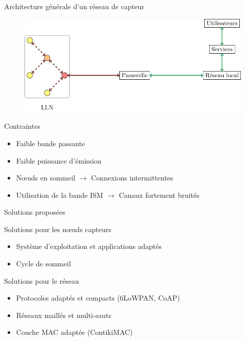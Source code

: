 \begin{frame}{Architecture générale d'un réseau de capteur}
  \begin{figure}
    \centering
    \includegraphics[scale=.75]{figures/schema_passerelle_slides.pdf}
  \end{figure}
  \begin{block}{Contraintes}
    \begin{itemize}
      \item Faible bande passante
      \item Faible puissance d'émission
      \item Nœuds en sommeil $\to$ Connexions intermittentes
      \item Utilisation de la bande ISM $\to$ Canaux fortement bruités
    \end{itemize}
  \end{block}


\end{frame}

\begin{frame}{Solutions proposées}

  \begin{block}{Solutions pour les nœuds capteurs}
    \begin{itemize}
      \item Système d'exploitation et applications adaptés
      \item Cycle de sommeil
    \end{itemize}
  \end{block}

  \begin{block}{Solutions pour le réseau}
    \begin{itemize}
      \item Protocoles adaptés et compacts (6LoWPAN, CoAP)
      \item Réseaux maillés et multi-sauts
      \item Couche MAC adaptée (ContikiMAC)
    \end{itemize}
  \end{block}
\end{frame}

